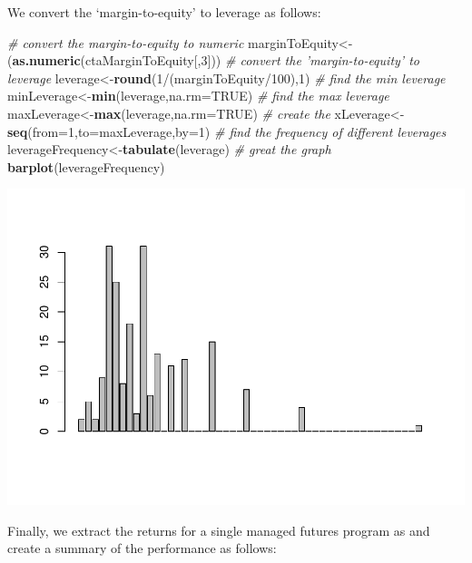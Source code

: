 \documentclass[]{article}
\newenvironment{Shaded}{\begin{snugshade}}{\end{snugshade}}
\newcommand{\KeywordTok}[1]{\textcolor[rgb]{0.13,0.29,0.53}{\textbf{{#1}}}}
\newcommand{\DataTypeTok}[1]{\textcolor[rgb]{0.13,0.29,0.53}{{#1}}}
\newcommand{\DecValTok}[1]{\textcolor[rgb]{0.00,0.00,0.81}{{#1}}}
\newcommand{\CommentTok}[1]{\textcolor[rgb]{0.56,0.35,0.01}{\textit{{#1}}}}
\newcommand{\OtherTok}[1]{\textcolor[rgb]{0.56,0.35,0.01}{{#1}}}
\newcommand{\NormalTok}[1]{{#1}}
\begin{document}
We convert the `margin-to-equity' to leverage as follows:

\begin{Shaded}
\begin{Highlighting}[]
\CommentTok{# convert the margin-to-equity to numeric}
\NormalTok{marginToEquity<-(}\KeywordTok{as.numeric}\NormalTok{(ctaMarginToEquity[,}\DecValTok{3}\NormalTok{]))}
\CommentTok{# convert the 'margin-to-equity' to leverage}
\NormalTok{leverage<-}\KeywordTok{round}\NormalTok{(}\DecValTok{1}\NormalTok{/(marginToEquity/}\DecValTok{100}\NormalTok{),}\DecValTok{1}\NormalTok{)}
\CommentTok{# find the min leverage}
\NormalTok{minLeverage<-}\KeywordTok{min}\NormalTok{(leverage,}\DataTypeTok{na.rm=}\OtherTok{TRUE}\NormalTok{)}
\CommentTok{# find the max leverage}
\NormalTok{maxLeverage<-}\KeywordTok{max}\NormalTok{(leverage,}\DataTypeTok{na.rm=}\OtherTok{TRUE}\NormalTok{)}
\CommentTok{# create the }
\NormalTok{xLeverage<-}\KeywordTok{seq}\NormalTok{(}\DataTypeTok{from=}\DecValTok{1}\NormalTok{,}\DataTypeTok{to=}\NormalTok{maxLeverage,}\DataTypeTok{by=}\DecValTok{1}\NormalTok{)}
\CommentTok{# find the frequency of different leverages}
\NormalTok{leverageFrequency<-}\KeywordTok{tabulate}\NormalTok{(leverage)}
\CommentTok{# great the graph}
\KeywordTok{barplot}\NormalTok{(leverageFrequency)}
\end{Highlighting}
\end{Shaded}

\includegraphics{diversificationInTheManagedFuturesUniverse_files/figure-latex/unnamed-chunk-32-1.pdf}

Finally, we extract the returns for a single managed futures program as
and create a summary of the performance as follows:
\end{document}
